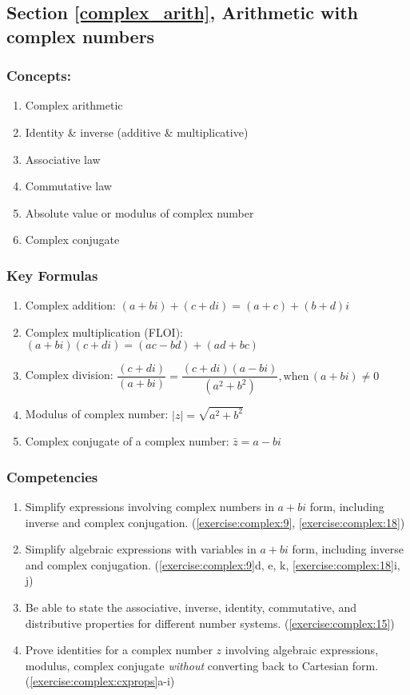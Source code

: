 \subsection*{Section \ref{complex_arith}, Arithmetic with complex numbers}
\subsubsection*{Concepts:}
\begin{enumerate}
\item 
Complex arithmetic
\item 
Identity \& inverse (additive \& multiplicative)
\item 
Associative law
\item 
Commutative law
\item 
Absolute value or modulus of complex number
\item 
Complex conjugate
\end{enumerate}

\subsubsection*{Key Formulas}
\begin{enumerate}
\item 
Complex addition: $(a + bi) + (c + di) = (a + c) + (b + d)i$
\item 
Complex multiplication (FLOI): $(a + bi)(c + di) = (ac - bd) + (ad + bc)$
\item 
Complex division: $\dfrac{(c + di)}{(a + bi)} = \dfrac{(c + di)(a - bi)}{(a^{2} +  b^{2})}, \text{when}\, (a + bi) \ne 0$
\item 
Modulus of complex number: $\mid z \mid = \sqrt{a^{2} + b^{2}}$
\item 
Complex conjugate of a complex number: $\bar{z} = a - bi$
\end{enumerate}

\subsubsection*{Competencies}
\begin{enumerate}
\item
Simplify expressions involving complex numbers in $a+bi$ form, including inverse and complex conjugation. (\ref{exercise:complex:9}, \ref{exercise:complex:18})
\item
Simplify algebraic expressions with variables in $a+bi$ form, including inverse and complex conjugation. (\ref{exercise:complex:9}d, e, k, \ref{exercise:complex:18}i, j)
\item
Be able to state the associative, inverse, identity, commutative, and distributive properties for different number systems. (\ref{exercise:complex:15})
\item
Prove identities for a complex number $z$ involving algebraic expressions, modulus, complex conjugate \emph{without} converting back to Cartesian form. (\ref{exercise:complex:cxprops}a-i)
\end{enumerate}


